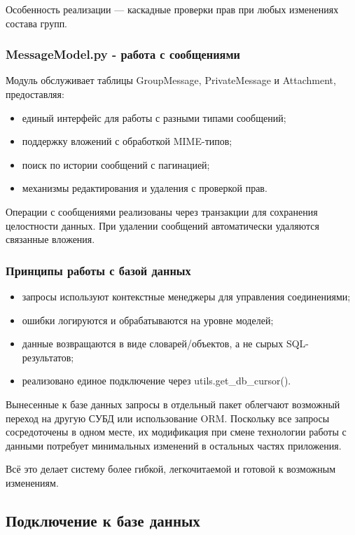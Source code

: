 Особенность реализации — каскадные проверки прав при любых изменениях состава групп.

\subsubsection{MessageModel.py - работа с сообщениями}
Модуль обслуживает таблицы GroupMessage, PrivateMessage и Attachment, предоставляя:
\begin{itemize}
	\item единый интерфейс для работы с разными типами сообщений;
	\item поддержку вложений с обработкой MIME-типов;
	\item поиск по истории сообщений с пагинацией;
	\item механизмы редактирования и удаления с проверкой прав.
\end{itemize}

Операции с сообщениями реализованы через транзакции для сохранения целостности данных. При удалении сообщений автоматически удаляются связанные вложения.

\subsubsection{Принципы работы с базой данных}
\begin{itemize}
	\item запросы используют контекстные менеджеры для управления соединениями;
	\item ошибки логируются и обрабатываются на уровне моделей;
	\item данные возвращаются в виде словарей/объектов, а не сырых SQL-результатов;
	\item реализовано единое подключение через utils.get\_db\_cursor().
\end{itemize}

Вынесенные к базе данных запросы в отдельный пакет облегчают возможный переход на другую СУБД или использование ORM. Поскольку все запросы сосредоточены в одном месте, их модификация при смене технологии работы с данными потребует минимальных изменений в остальных частях приложения.

Всё это делает систему более гибкой, легкочитаемой и готовой к возможным изменениям.

\subsection{Подключение к базе данных}

